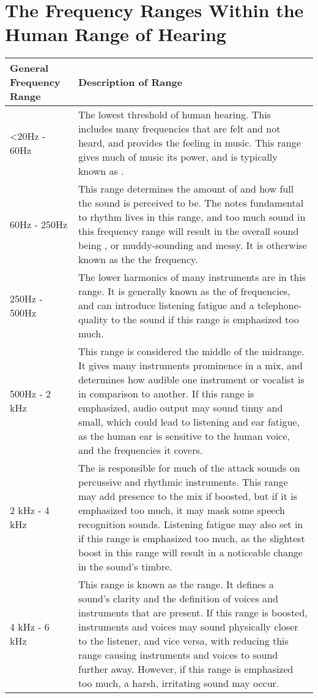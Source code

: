 \chapter{The Frequency Ranges Within the Human Range of Hearing}\label{appendix:frequency-table}
\begin{table}
	\begin{tabular}{|p{20em}  p{25em}|}
		\hline
		General Frequency Range & Description of Range \\ 
		\hline
		<20Hz - 60Hz & The lowest threshold of human hearing. This includes many frequencies that are felt and not heard, and provides the \say{rumble} feeling in music. This range gives much of music its power, and is typically known as \say{sub-bass}. \\
		\hline
		60Hz - 250Hz & This range determines the amount of \say{warmth} and how full the sound is perceived to be. The notes fundamental to rhythm lives in this range, and too much sound in this frequency range will result in the overall sound being \say{boomy}, or muddy-sounding and messy. It is otherwise known as the the \say{bass} frequency. \\
		\hline
		250Hz - 500Hz & The lower harmonics of many instruments are in this range. It is generally known as the \say{lower midrange} of frequencies, and can introduce listening fatigue and a telephone-quality to the sound if this range is emphasized too much. \\
		\hline
		500Hz - 2 kHz & This range is considered the middle of the midrange. It gives many instruments prominence in a mix, and determines how audible one instrument or vocalist is in comparison to another. If this range is emphasized, audio output may sound tinny and small, which could lead to listening and ear fatigue, as the human ear is sensitive to the human voice, and the frequencies it covers. \\
		\hline
		2 kHz - 4 kHz & The \say{upper midrange} is responsible for much of the attack sounds on percussive and rhythmic instruments. This range may add presence to the mix if boosted, but if it is emphasized too much, it may mask some speech recognition sounds. Listening fatigue may also set in if this range is emphasized too much, as the slightest boost in this range will result in a noticeable change in the sound's timbre. \\
		\hline
		4 kHz - 6 kHz & This range is known as the \say{presence} range. It defines a sound's clarity and the definition of voices and instruments that are present. If this range is boosted, instruments and voices may sound physically closer to the listener, and vice versa, with reducing this range causing instruments and voices to sound further away. However, if this range is emphasized too much, a harsh, irritating sound may occur. \\

\end{tabular}
\end{table}
